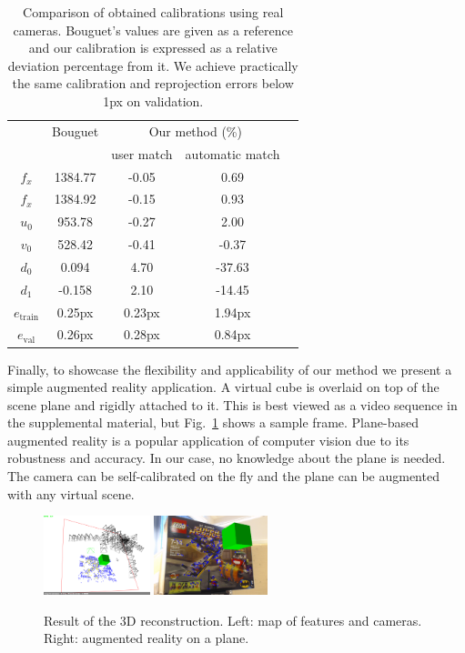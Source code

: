 \documentclass[10pt,twocolumn,letterpaper]{article}
\begin{document}
\begin{table}
\caption{Comparison of obtained calibrations using real cameras. Bouguet's values are given as a reference and our calibration is expressed as a relative deviation percentage from it. We achieve practically the same calibration and reprojection errors below 1px on validation.}
\label{fig:results_real_numbers}
\centering
\begin{tabular}{|c|c|c|c|c|}
\hline
& Bouguet \cite{bouguetMCT} & \multicolumn{2}{|c|}{Our method (\%)} \\
& & user match & automatic match  \\
 \hline
$f_x$ & 1384.77 & -0.05 & 0.69 \\
$f_x$ & 1384.92 & -0.15 & 0.93 \\
$u_0$ & 953.78 & -0.27 &  2.00 \\
$v_0$ & 528.42 & -0.41 &  -0.37 \\
$d_0$ & 0.094 & 4.70  &  -37.63 \\
$d_1$ & -0.158 & 2.10 &  -14.45 \\
  \hline
  $e_{\text{train}}$ & 0.25px & 0.23px & 1.94px\\ 
$e_{\text{val}}$ & 0.26px & 0.28px & 0.84px \\ 
  \hline
\end{tabular}
\end{table}

Finally, to showcase the flexibility and applicability of our method we present a simple augmented reality application. A virtual cube is overlaid on top of the scene plane and rigidly attached to it. This is best viewed as a video sequence in the supplemental material, but Fig.~\ref{fig:arcube} shows a sample frame. Plane-based augmented reality is a popular application of computer vision due to its robustness and accuracy. In our case, no knowledge about the plane is needed. The camera can be self-calibrated on the fly and the plane can be augmented with any virtual scene.

\begin{figure}
\centering
\includegraphics[height=2.3cm]{images/map3d.png}
\includegraphics[height=2.3cm]{images/arcube.png}
\caption{Result of the 3D reconstruction. Left: map of features and cameras. Right: augmented reality on a plane.}
\label{fig:arcube}
\end{figure}  
\end{document}
